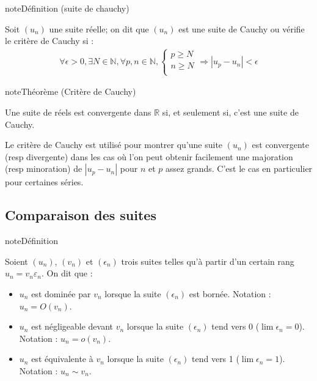 \documentclass[letterpaper,10pt,french]{jupyterBook}
\begin{document}
\begin{sphinxadmonition}{note}{Définition (suite de chauchy)}

\sphinxAtStartPar
Soit \((u_n)\) une suite réelle; on dit que \((u_n)\) est une suite de Cauchy ou vérifie le critère de Cauchy si :
\begin{equation*}
\begin{split}
\forall \epsilon>0, \exists N \in \mathbb{N},  \forall p, n \in \mathbb{N}, \left\{
\begin{array}{ll}
 p\geq N\\
n\geq N\\
\end{array}
\right. \Rightarrow |u_p-u_n|<\epsilon
\end{split}
\end{equation*}\end{sphinxadmonition}

\begin{sphinxadmonition}{note}{Théorème (Critère de Cauchy)}

\sphinxAtStartPar
Une suite de réels est convergente dans \(\mathbb{R}\) si, et seulement si, c’est une suite de Cauchy.
\end{sphinxadmonition}

\sphinxAtStartPar
Le critère de Cauchy est utilisé pour montrer qu’une suite \((u_n)\) est convergente (resp divergente) dans les cas où l’on peut obtenir facilement une majoration (resp minoration) de \(|u_p−u_n|\) pour \(n\) et \(p\) assez grands. C’est le cas en particulier pour certaines séries.


\subsection{Comparaison des suites}
\label{\detokenize{complements:comparaison-des-suites}}
\begin{sphinxadmonition}{note}{Définition}

\sphinxAtStartPar
Soient \((u_n)\), \((v_n)\) et \((\epsilon_n)\) trois suites telles qu’à partir d’un certain rang \(u_n = v_nε_n\). On dit que :
\begin{itemize}
\item {} 
\sphinxAtStartPar
\(u_n\) est dominée par \(v_n\) lorsque la suite \((\epsilon_n)\) est bornée. Notation : \(u_n = O(v_n)\).

\item {} 
\sphinxAtStartPar
\(u_n\) est négligeable devant \(v_n\) lorsque la suite \((\epsilon_n)\) tend vers 0 (\(\lim \epsilon_n =0\)). Notation : \(u_n = o(v_n)\).

\item {} 
\sphinxAtStartPar
\(u_n\) est équivalente à \(v_n\) lorsque la suite \((\epsilon_n)\) tend vers 1 (\(\lim \epsilon_n =1\)). Notation : \(u_n \sim v_n\).

\end{itemize}
\end{sphinxadmonition}
\end{document}
